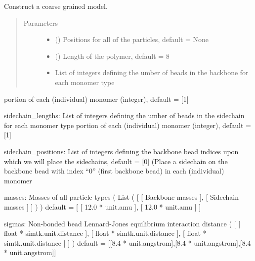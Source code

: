 \documentclass[letterpaper,12pt,english,openany,oneside]{sphinxmanual}
\begin{document}
\begin{fulllineitems}
Construct a coarse grained model.
\begin{quote}\begin{description}
\item[{Parameters}] \leavevmode\begin{itemize}
\item {} 
 (\sphinxstyleliteralemphasis{\sphinxupquote{( }}\sphinxstyleliteralemphasis{\sphinxupquote{ ( }}\sphinxstyleliteralemphasis{\sphinxupquote{ ) }}\sphinxstyleliteralemphasis{\sphinxupquote{)}}) \textendash{} Positions for all of the particles, default = None

\item {} 
 () \textendash{} Length of the polymer, default = 8

\item {} 
 \textendash{} List of integers defining the umber of beads in the backbone for each monomer type

\end{itemize}

\end{description}\end{quote}

portion of each (individual) monomer (integer), default = {[}1{]}

sidechain\_lengths: List of integers defining the umber of beads in the sidechain for each monomer type
portion of each (individual) monomer (integer), default = {[}1{]}

sidechain\_positions: List of integers defining the backbone
bead indices upon which we will place the sidechains,
default = {[}0{]} (Place a sidechain on the backbone bead with
index “0” (first backbone bead) in each (individual) monomer

masses: Masses of all particle types
( List ( {[} {[} Backbone masses {]}, {[} Sidechain masses {]} {]} ) )
default = {[} {[} 12.0 * unit.amu {]}, {[} 12.0 * unit.amu {]} {]}

sigmas: Non-bonded bead Lennard-Jones equilibrium interaction distance
( {[} {[} float * simtk.unit.distance {]}, {[} float * simtk.unit.distance {]}, {[} float * simtk.unit.distance {]} {]} )
default = {[}{[}8.4 * unit.angstrom{]},{[}8.4 * unit.angstrom{]},{[}8.4 * unit.angstrom{]}{]}


\end{fulllineitems}
\end{document}
